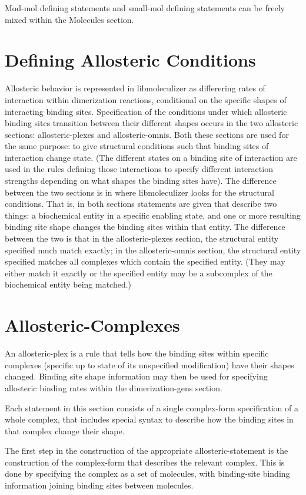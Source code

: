 Mod-mol defining statements and small-mol defining statements can be
freely mixed within the Molecules section.

\section{Defining Allosteric Conditions}
Allosteric behavior is represented in libmoleculizer as differering
rates of interaction within dimerization reactions, conditional on the
specific shapes of interacting binding sites.  Specification of the
conditions under which allosteric binding sites transition between
their different shapes occurs in the two allosteric sections:
allosteric-plexes and allosteric-omnis.  Both these sections are used
for the same purpose: to give structural conditions such that binding
sites of interaction change state.  (The different states on a binding
site of interaction are used in the rules defining those interactions
to specify different interaction strengths depending on what shapes
the binding sites have).  The difference between the two sections is
in where libmoleculizer looks for the structural conditions.  That is,
in both sections statements are given that describe two things: a
biochemical entity in a specific enabling state, and one or more
resulting binding site shape changes the binding sites within that
entity.  The difference between the two is that in the
allosteric-plexes section, the structural entity specified much match
exactly; in the allosteric-omnis section, the structural entity
specified matches all complexes which contain the specified entity.
(They may either match it exactly or the specified entity may be a
subcomplex of the biochemical entity being matched.)

\section{Allosteric-Complexes}
An allosteric-plex is a rule that tells how the binding sites within
specific complexes (specific up to state of its unspecified
modification) have their shapes changed.  Binding site shape
information may then be used for specifying allosteric binding rates
within the dimerization-gens section.

Each statement in this section consists of a single complex-form
specification of a whole complex, that includes special syntax to
describe how the binding sites in that complex change their shape.

The first step in the construction of the appropriate
allosteric-statement is the construction of the complex-form that
describes the relevant complex.  This is done by specifying the
complex as a set of molecules, with binding-site binding information
joining binding sites between molecules.  


